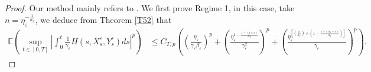 \documentclass[11pt,reqno]{amsart}
\numberwithin{equation}{section}
\begin{document}
\begin{proof}
  Our method mainly refers to \cite[Lemma 4.4]{RX}. 	We first prove Regime 1, in this case, take $n=\eta_{\varepsilon}^{-\frac{1}{\alpha_{2}}}$, we deduce from Theorem \ref{T52} that 
\begin{equation}
	\begin{split}
		\mathbb{E}\left( \sup_{t\in [0,T]}\left| \int_{0}^{t} \frac{1}{\gamma_{\varepsilon}}H(s,X_{s}^{\varepsilon},Y_{s}^{\varepsilon})ds\right|^{p} \right)  &\leq  C_{T,p}\left(\left(  \frac{\eta_{\varepsilon}}{\gamma_{\varepsilon}\beta_{\varepsilon}}\right) ^{p}+\left(  \frac{\eta_{\varepsilon}^{1-\frac{1-(1\wedge v)}{\alpha_{2}}}}{\gamma_{\varepsilon}^{2}}\right) ^{p}+\left( \frac{\eta_{\varepsilon}^{\left[ \left( \frac{v}{\alpha_{2}}\right) \wedge \left( 1-\frac{1\vee(\alpha_{1}-v)}{\alpha_{2}}\right) \right] }}{\gamma_{\varepsilon} } \right) ^{p}\right).
	\nonumber
	\end{split}
\end{equation}




\end{proof}
\end{document}
